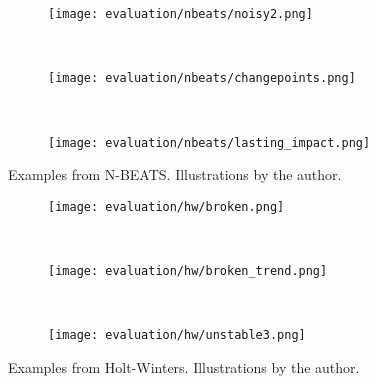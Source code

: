 \begin{figure}[htp!]
    \begin{subfigure}[b]{\linewidth}
        \centering
        \texttt{[image: evaluation/nbeats/noisy2.png]}
        \label{fig:nbeats-cyclicity}
    \end{subfigure}
    \\
    \begin{subfigure}[b]{\linewidth}
        \centering
        \texttt{[image: evaluation/nbeats/changepoints.png]}
        \label{fig:nbeats-resembles}
    \end{subfigure}
    \\
    \begin{subfigure}[b]{\linewidth}
        \centering
        \texttt{[image: evaluation/nbeats/lasting\_impact.png]}
        \label{fig:nbeats-spike-impact}
    \end{subfigure}
    \caption[Examples from N-BEATS.]{Examples from N-BEATS\@. Illustrations by the author.}\label{fig:nbeats-output}
\end{figure}

\begin{figure}[htp!]
    \begin{subfigure}[b]{\linewidth}
        \centering
        \texttt{[image: evaluation/hw/broken.png]}
        \label{fig:hw-broken}
    \end{subfigure}
    \\
    \begin{subfigure}[b]{\linewidth}
        \centering
        \texttt{[image: evaluation/hw/broken\_trend.png]}
        \label{fig:hw-trend-instability}
    \end{subfigure}
    \\
    \begin{subfigure}[b]{\linewidth}
        \centering
        \texttt{[image: evaluation/hw/unstable3.png]}
        \label{fig:hw-ordinary}
    \end{subfigure}
    \caption[Examples from Holt-Winters.]{Examples from Holt-Winters. Illustrations by the author.}\label{fig:hw-output}
\end{figure}

